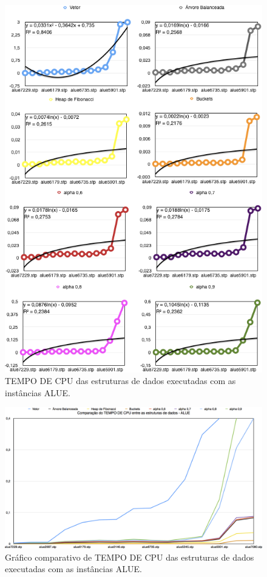 \documentclass[
	12pt,				%
	oneside,			%
	a4paper,			%
	english,			%
	french,				%
	spanish,			%
	brazil,				%
	]{abntex2}
\begin{document}
\begin{figure}[H]
 \centering
 \includegraphics[width=6.4in]{charts/cpu_all_alue.png}
 \caption{TEMPO DE CPU das estruturas de dados executadas com as instâncias ALUE.}
 \label{fig:AlueGraphTime}
\end{figure}

\begin{figure}[H]
 \centering
 \includegraphics[width=6.4in]{charts/comp_ed_alue.png}
 \caption{Gráfico comparativo de TEMPO DE CPU das estruturas de dados executadas com as instâncias ALUE.}
 \label{fig:AlueGraphTimeAll}
\end{figure}
\end{document}
